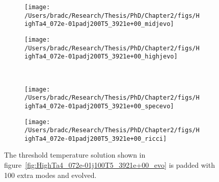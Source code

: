 \documentclass[../PhD.tex]{subfiles}
\begin{document}
\begin{figure}[h]
	\centering
	\begin{subfigure}[t]{0.45\textwidth}
		\texttt{[image: /Users/bradc/Research/Thesis/PhD/Chapter2/figs/HighTa4\_072e-01padj200T5\_3921e+00\_midjevo]}
	\end{subfigure}
	\;
	\begin{subfigure}[t]{0.45\textwidth}
		\texttt{[image: /Users/bradc/Research/Thesis/PhD/Chapter2/figs/HighTa4\_072e-01padj200T5\_3921e+00\_highjevo]}
	\end{subfigure}
	\\
	\begin{subfigure}[t]{0.45\textwidth}
		\texttt{[image: /Users/bradc/Research/Thesis/PhD/Chapter2/figs/HighTa4\_072e-01padj200T5\_3921e+00\_specevo]}
	\end{subfigure}
	\;
	\begin{subfigure}[t]{0.45\textwidth}
	\texttt{[image: /Users/bradc/Research/Thesis/PhD/Chapter2/figs/HighTa4\_072e-01padj200T5\_3921e+00\_ricci]}
	\end{subfigure}
	\caption[Evolution of the spectrum of a threshold temperature solution that has been padded with $100$ modes]{The threshold temperature solution shown in figure~\ref{fig:HighTa4_072e-01j100T5_3921e+00_evo} is padded with 100 extra modes and evolved.}
	\label{fig: HighTa4_072e-01padj200T5_3921e+00_evo}
\end{figure}

\end{document}
